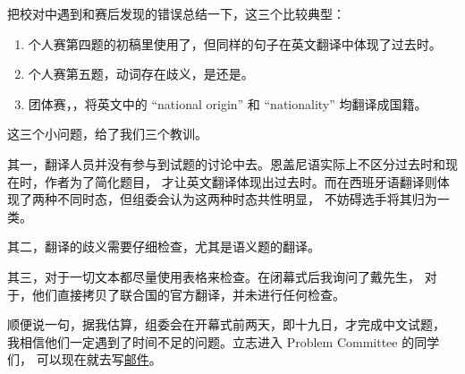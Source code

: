 把校对中遇到和赛后发现的错误总结一下，这三个比较典型：

\begin{enumerate}
\item 个人赛第四题的初稿里使用了，但同样的句子在英文翻译中体现了过去时。

\item 个人赛第五题，动词存在歧义，是还是。

\item 团体赛，，将英文中的 “national origin” 和 “nationality” 均翻译成国籍。
\end{enumerate}

这三个小问题，给了我们三个教训。

其一，翻译人员并没有参与到试题的讨论中去。恩盖尼语实际上不区分过去时和现在时，作者为了简化题目，
才让英文翻译体现出过去时。而在西班牙语翻译则体现了两种不同时态，但组委会认为这两种时态共性明显，
不妨碍选手将其归为一类。

其二，翻译的歧义需要仔细检查，尤其是语义题的翻译。

其三，对于一切文本都尽量使用表格来检查。在闭幕式后我询问了戴先生，
对于，他们直接拷贝了联合国的官方翻译，并未进行任何检查。

顺便说一句，据我估算，组委会在开幕式前两天，即十九日，才完成中文试题，
我相信他们一定遇到了时间不足的问题。立志进入 Problem Committee 的同学们，
可以现在就去写\href{mailto:pc-chair@ioling.org}{邮件}。
